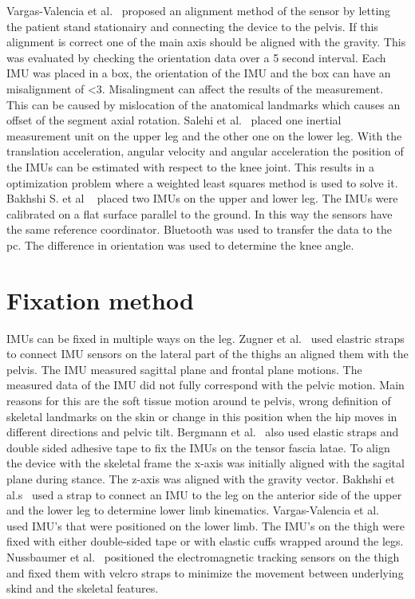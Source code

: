 \documentclass[whitelogo]{tudelft-report}
\begin{document}
{Vargas-Valencia et al.~\cite{vargas2016imu} proposed an alignment method of the sensor by letting the patient stand stationairy and connecting the device to the pelvis. If this alignment is correct one of the main axis should be aligned with the gravity. This was evaluated by checking the orientation data over a 5 second interval. Each IMU was placed in a box, the orientation of the IMU and the box can have an misalignment of \textless3\degree. Misalingment can affect the results of the measurement. This can be caused by mislocation of the anatomical landmarks which causes an offset of the segment axial rotation. Salehi et al.~\cite{salehi2015body} placed one inertial measurement unit on the upper leg and the other one on the lower leg. With the translation acceleration, angular velocity and angular acceleration the position of the IMUs can be estimated with respect to the knee joint. This results in a optimization problem where a weighted least squares method is used to solve it. Bakhshi S. et al ~\cite{bakhshi2011development} placed two IMUs on the upper and lower leg. The IMUs were calibrated on a flat surface parallel to the ground. In this way the sensors have the same reference coordinator. Bluetooth was used to transfer the data to the pc. The difference in orientation was used to determine the knee angle. 


\section{Fixation method} 
IMUs can be fixed in multiple ways on the leg. Zugner et al.~\cite{zugner2019validation} used elastric straps to connect IMU sensors on the lateral part of the thighs an aligned them with the pelvis. The IMU measured sagittal plane and frontal plane motions. The measured data of the IMU did not fully correspond with the pelvic motion. Main reasons for this are the soft tissue motion around te pelvis, wrong definition of skeletal landmarks on the skin or change in this position when the hip moves in different directions and pelvic tilt. Bergmann et al.~\cite{bergmann2009portable} also used elastic straps and double sided adhesive tape to fix the IMUs on the tensor fascia latae. To align the device with the skeletal frame the x-axis was initially aligned with the sagital plane during stance. The z-axis was aligned with the gravity vector. Bakhshi et al.s~\cite{bakhshi2011development} used a strap to connect an IMU to the leg on the anterior side of the upper and the lower leg to determine lower limb kinematics. Vargas-Valencia et al.~\cite{vargas2016imu} used IMU's that were positioned on the lower limb. The IMU's on the thigh were fixed with either double-sided tape or with elastic cuffs wrapped around the legs. Nussbaumer et al.~\cite{nussbaumer2010validity} positioned the electromagnetic tracking sensors on the thigh and fixed them with velcro straps to minimize the movement between underlying skind and the skeletal features. 


}
\end{document}
